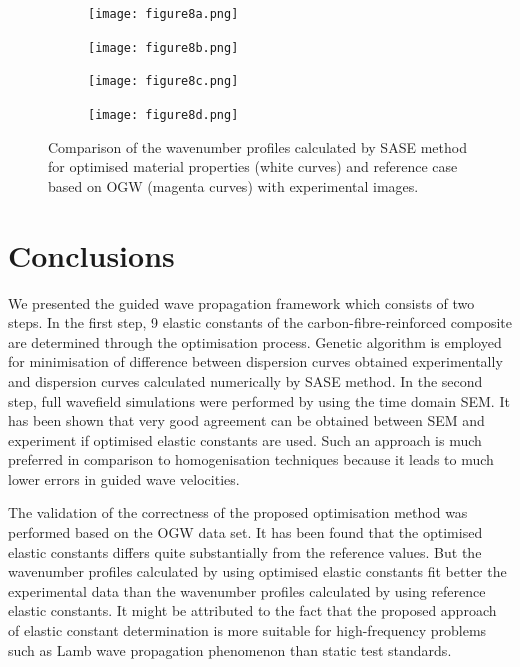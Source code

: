 \documentclass[preprint,12pt]{elsarticle}
\begin{document}
\begin{figure} [h!]
	\centering
	\begin{subfigure}[b]{0.47\textwidth}
		\centering
		\texttt{[image: figure8a.png]}
		\caption{}
		\label{fig:freq3_opt_Moll}
	\end{subfigure}
	\hfill
	\begin{subfigure}[b]{0.47\textwidth}
		\centering
		\texttt{[image: figure8b.png]}
		\label{fig:freq4_opt_Moll}
	\end{subfigure}
	\hfill
	\begin{subfigure}[b]{0.47\textwidth}
		\centering
		\texttt{[image: figure8c.png]}
		\label{fig:freq5_opt_Moll}
	\end{subfigure}
	\hfill
	\begin{subfigure}[b]{0.47\textwidth}
		\centering
		\texttt{[image: figure8d.png]}
		\label{fig:freq7_opt_Moll}
	\end{subfigure}
	\caption{Comparison of the wavenumber profiles calculated by SASE method for optimised material properties (white curves) and reference case based on OGW (magenta curves) with experimental images.}
	\label{fig:freq_slice_opt_Moll}
\end{figure}
\clearpage
\section{Conclusions}
We presented the guided wave propagation framework which consists of two steps. 
In the first step, 9 elastic constants of the carbon-fibre-reinforced composite are determined through the optimisation process. 
Genetic algorithm is employed for minimisation of difference between dispersion curves obtained experimentally and dispersion curves calculated numerically by SASE method.
In the second step, full wavefield simulations were performed by using the time domain SEM. 
It has been shown that very good agreement can be obtained between SEM and experiment if optimised elastic constants are used. 
Such an approach is much preferred in comparison to homogenisation techniques because it leads to much lower errors in guided wave velocities.

The validation of the correctness of the proposed optimisation method was performed based on the OGW data set.
It has been found that the optimised elastic constants differs quite substantially from the reference values. 
But the wavenumber profiles calculated by using optimised elastic constants fit better the experimental data than the wavenumber profiles calculated by using reference elastic constants.
It might be attributed to the fact that the proposed approach of elastic constant determination is more suitable for high-frequency problems such as Lamb wave propagation phenomenon than static test standards.
\end{document}

